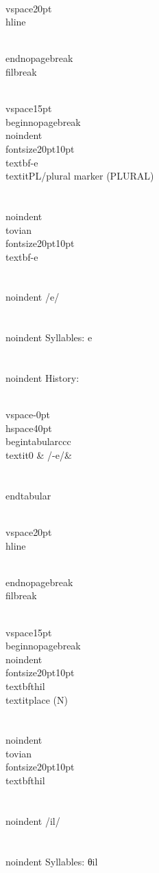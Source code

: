 \\vspace{20pt}\\hline

\\end{nopagebreak}
\\filbreak



\\vspace{15pt}
\\begin{nopagebreak}
\\noindent{\\fontsize{20pt}{10pt}\\textbf{-e} } \\textit{PL/plural marker} (PLURAL)\\\\
\\noindent {\\tovian \\fontsize{20pt}{10pt} \\textbf{-e} }\\\\
\\noindent /{\textprimstress}e/\\\\
\\noindent Syllables: e\\\\


\\noindent History:

\\vspace{-0pt}
\\hspace{40pt}
\\begin{tabular}{ccc}
\\textit{0} & /-e/& \\\\
\\end{tabular}

\\vspace{20pt}\\hline

\\end{nopagebreak}
\\filbreak



\\vspace{15pt}
\\begin{nopagebreak}
\\noindent{\\fontsize{20pt}{10pt}\\textbf{thil} } \\textit{place} (N)\\\\
\\noindent {\\tovian \\fontsize{20pt}{10pt} \\textbf{thil} }\\\\
\\noindent /{\texttheta}{\textprimstress}il/\\\\
\\noindent Syllables: θil\\\\



